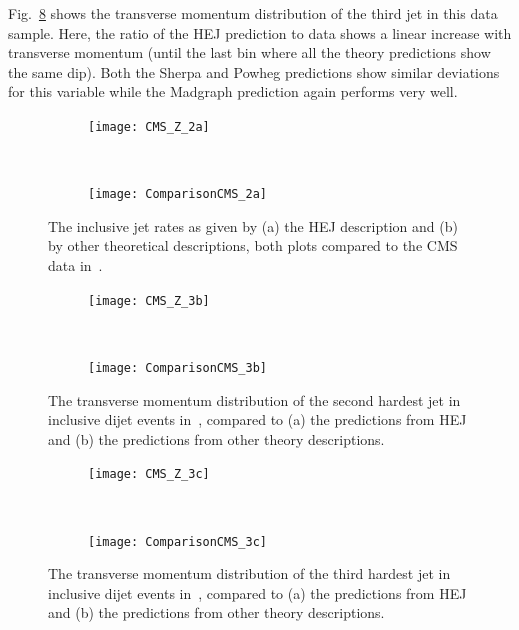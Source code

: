 	Fig.~\ref{fig:CMS_3c} shows the transverse momentum distribution of the third
	jet in this data sample.  Here, the ratio of the HEJ prediction to data shows a
	linear increase with transverse momentum (until the last bin where all the
	theory predictions show the same dip).  Both the Sherpa and Powheg predictions
	show similar deviations for this variable while the Madgraph prediction again
	performs very well.


	\begin{figure}[h]
	  \centering
	  \begin{subfigure}[b]{0.46\textwidth}
	    \texttt{[image: CMS\_Z\_2a]}
	    \caption{}
	    \label{fig:HEJ_CMS_2a}
	  \end{subfigure}
	  ~
	  \begin{subfigure}[b]{0.48\textwidth}
	    \texttt{[image: ComparisonCMS\_2a]}
	    \caption{}
	    \label{fig:MC_CMS_2a}
	  \end{subfigure}
	  \caption{The inclusive jet rates as given by (a) the HEJ description and (b)
	    by other theoretical descriptions, both plots compared to the CMS data in~\cite{Khachatryan:2014zya}.}
	  \label{fig:CMS_2a}

	  \begin{subfigure}[b]{0.46\textwidth}
	    \texttt{[image: CMS\_Z\_3b]}
	    \caption{}
	    \label{fig:HEJ_CMS_7b}
	  \end{subfigure}
	  ~
	  \begin{subfigure}[b]{0.48\textwidth}
	    \texttt{[image: ComparisonCMS\_3b]}
	    \caption{}
	    \label{fig:MC_CMS_7b}
	  \end{subfigure}
	  \caption{The transverse momentum distribution of the second hardest jet in
	    inclusive dijet events in~\cite{Khachatryan:2014zya}, compared to (a) the
	    predictions from HEJ and (b) the predictions from other theory descriptions.}
	  \label{fig:CMS_3b}
	\end{figure}

	\begin{figure}[H]
	  \centering
	  \begin{subfigure}[b]{0.46\textwidth}
	    \texttt{[image: CMS\_Z\_3c]}
	    \caption{}
	    \label{fig:HEJ_CMS_7b}
	  \end{subfigure}
	  ~
	  \begin{subfigure}[b]{0.48\textwidth}
	    \texttt{[image: ComparisonCMS\_3c]}
	    \caption{}
	    \label{fig:MC_CMS_7b}
	  \end{subfigure}
	  \caption{The transverse momentum distribution of the third hardest jet in
	    inclusive dijet events in~\cite{Khachatryan:2014zya}, compared to (a) the
	    predictions from HEJ and (b) the predictions from other theory descriptions.}
	  \label{fig:CMS_3c}
	\end{figure}

